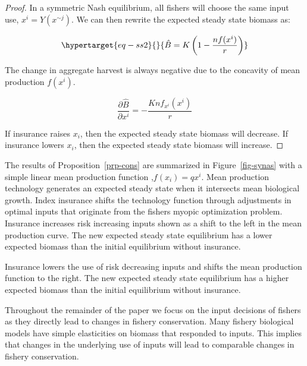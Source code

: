 \documentclass[
  letterpaper,
  DIV=11,
  numbers=noendperiod]{scrartcl}
\theoremstyle{plain}
\theoremstyle{plain}
\theoremstyle{remark}
\begin{document}
\begin{proof}

In a symmetric Nash equilibrium, all fishers will choose the same input
use, \(x^i=Y(x^{\sim j})\). We can then rewrite the expected steady
state biomass as:

\begin{equation}\protect\hypertarget{eq-ss2}{}{
\hat{B}=K\left(1-\frac{nf(x^i)}{r}\right)
}\label{eq-ss2}\end{equation}

The change in aggregate harvest is always negative due to the concavity
of mean production \(f(x^i)\).

\[
\frac{\partial \hat{B}}{\partial x^i}=-\frac{Knf_{x^i}(x^i)}{r}
\]

If insurance raises \(x_i\), then the expected steady state biomass will
decrease. If insurance lowers \(x_i\), then the expected steady state
biomass will increase.

\end{proof}

The results of Proposition~\ref{prp-cons} are summarized in
Figure~\ref{fig-synas} with a simple linear mean production function
,\(f(x_i)=qx^i\). Mean production technology generates an expected
steady state when it intersects mean biological growth. Index insurance
shifts the technology function through adjustments in optimal inputs
that originate from the fishers myopic optimization problem. Insurance
increases risk increasing inputs shown as a shift to the left in the
mean production curve. The new expected steady state equilibrium has a
lower expected biomass than the initial equilibrium without insurance.

Insurance lowers the use of risk decreasing inputs and shifts the mean
production function to the right. The new expected steady state
equilibrium has a higher expected biomass than the initial equilibrium
without insurance.

Throughout the remainder of the paper we focus on the input decisions of
fishers as they directly lead to changes in fishery conservation. Many
fishery biological models have simple elasticities on biomass that
responded to inputs. This implies that changes in the underlying use of
inputs will lead to comparable changes in fishery conservation.
\end{document}
